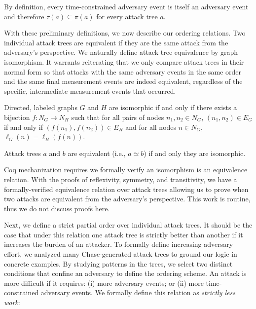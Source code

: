 \documentclass[runningheads]{llncs}
\theoremstyle{definition}
\begin{document}
\noindent By definition, every time-constrained adversary event is
itself an adversary event and therefore $\tau(a) \subseteq \pi(a)$ for
every attack tree $a$. 

With these preliminary definitions, we now describe our ordering
relations. Two individual attack trees are equivalent if they are
the same attack from the adversary's perspective. We naturally 
define attack tree equivalence by graph isomorphism. It warrants
reiterating that we only compare attack trees in their normal form 
so that attacks with the same adversary events in the same order 
and the same final measurement events are indeed equivalent, regardless 
of the specific, intermediate measurement events that occurred. 

\begin{definition}[Isomorphism]
  Directed, labeled graphs $G$ and $H$ are isomorphic if and only if
  there exists a bijection $f : N_G \to N_H$ such that for all pairs
  of nodes $n_1, n_2 \in N_G$, $(n_1,n_2) \in E_G$ if and only if
  $(f(n_1),f(n_2)) \in E_H$ and for all nodes $n \in N_G$,
  $\ell_G(n) = \ell_H(f(n))$. 
\end{definition}

\begin{definition}
  Attack trees $a$ and $b$ are equivalent (i.e., $a \simeq b$) if and
  only they are isomorphic. 
\end{definition}

Coq mechanization requires we formally verify an isomorphism
is an equivalence relation.  With the proofs of reflexivity, symmetry,
and transitivity, we have a formally-verified equivalence relation
over attack trees allowing us to prove when two attacks are equivalent
from the adversary's perspective. This work is routine, thus we do not 
discuss proofs here.

Next, we define a strict partial order over individual attack
trees. It should be the case that under this relation one attack tree
is strictly better than another if it increases the burden of an
attacker. To formally define increasing adversary effort, we
analyzed many Chase-generated attack trees to ground our logic in
concrete examples. By studying patterns in the trees, we select two
distinct conditions that confine an adversary to define the ordering
scheme.  An attack is more difficult if it requires: (i) more
adversary events; or (ii) more time-constrained adversary events. We
formally define this relation as \emph{strictly less work}:
\end{document}
